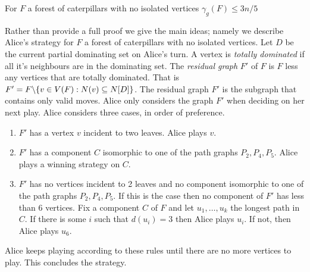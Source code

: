 \begin{theorem}\label{thm:domcat}
    For $F$ a forest of caterpillars with no isolated vertices 
    $\gamma_g(F)\leq 3n/5$ 
\end{theorem}
    
Rather than provide a full proof we give the main ideas; namely we describe Alice's strategy for $F$ a forest of caterpillars with no isolated vertices. 
    Let $D$ be the current partial dominating set on Alice's turn. A vertex is \textit{totally dominated} if all it's neighbours are in the dominating set. The \textit{residual graph} $F'$ of $F$ is $F$ less any vertices that are totally dominated. That is $F'=F\backslash\{v\in V(F): N(v)\subseteq N[D]\}$. The residual graph $F'$ is the subgraph that contains only valid moves. Alice only considers the graph $F'$ when deciding on her next play. Alice considers three cases, in order of preference.
    \begin{enumerate}        
    \item $F'$ has a vertex $v$ incident to two leaves. Alice plays $v$. 
    
    \item $F'$ has a component $C$ isomorphic to one of the path graphs $P_2,P_4,P_5$. Alice plays a winning strategy on $C$. 
    
    \item $F'$ has no vertices incident to 2 leaves and no component isomorphic to one of the path graphs $P_2,P_4,P_5$. If this is the case then no component of $F'$ has less than 6 vertices. Fix a component $C$ of $F$ and let $u_1,\dots,u_k$ the longest path in $C$. If there is some $i$ such that $d(u_i)=3$ then Alice plays $u_i$. If not, then Alice plays $u_6$.    
    \end{enumerate}
Alice keeps playing according to these rules until there are no more vertices to play. This concludes the strategy.
